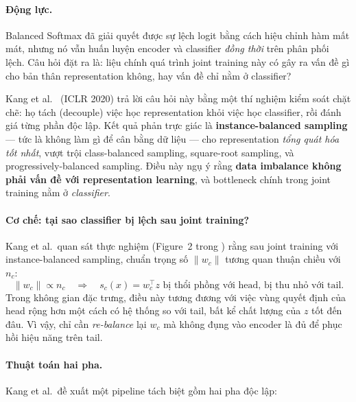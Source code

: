 \paragraph{Động lực.}
Balanced Softmax đã giải quyết được sự lệch logit bằng cách hiệu chỉnh hàm mất mát,
nhưng nó vẫn huấn luyện encoder và classifier \emph{đồng thời} trên phân phối lệch.
Câu hỏi đặt ra là: liệu chính quá trình joint training này có gây ra vấn đề gì
cho bản thân representation không, hay vấn đề chỉ nằm ở classifier?

Kang et al.\ \cite{kang2020decoupling} (ICLR 2020) trả lời câu hỏi này bằng
một thí nghiệm kiểm soát chặt chẽ: họ tách (decouple) việc học representation
khỏi việc học classifier, rồi đánh giá từng phần độc lập.
Kết quả phản trực giác là \textbf{instance-balanced sampling} ---
tức là không làm gì để cân bằng dữ liệu ---
cho representation \emph{tổng quát hóa tốt nhất}, vượt trội
class-balanced sampling, square-root sampling, và progressively-balanced sampling.
Điều này ngụ ý rằng \textbf{data imbalance không phải vấn đề với representation
learning}, và bottleneck chính trong joint training nằm ở \emph{classifier}.

\paragraph{Cơ chế: tại sao classifier bị lệch sau joint training?}
Kang et al.\ quan sát thực nghiệm (Figure~2 trong \cite{kang2020decoupling})
rằng sau joint training với instance-balanced sampling,
chuẩn trọng số $\lVert w_c \rVert$ tương quan thuận chiều với $n_c$:
\begin{equation}
    \lVert w_c \rVert \propto n_c
    \quad \Longrightarrow \quad
    s_c(x) = w_c^\top z \text{ bị thổi phồng với head, bị thu nhỏ với tail.}
    \label{eq:weight-norm}
\end{equation}
Trong không gian đặc trưng, điều này tương đương với việc vùng quyết định
của head rộng hơn một cách có hệ thống so với tail, bất kể chất lượng
của $z$ tốt đến đâu.
Vì vậy, chỉ cần \emph{re-balance} lại $w_c$ mà không đụng vào encoder
là đủ để phục hồi hiệu năng trên tail.

\paragraph{Thuật toán hai pha.}
Kang et al.\ đề xuất một pipeline tách biệt gồm hai pha độc lập:

